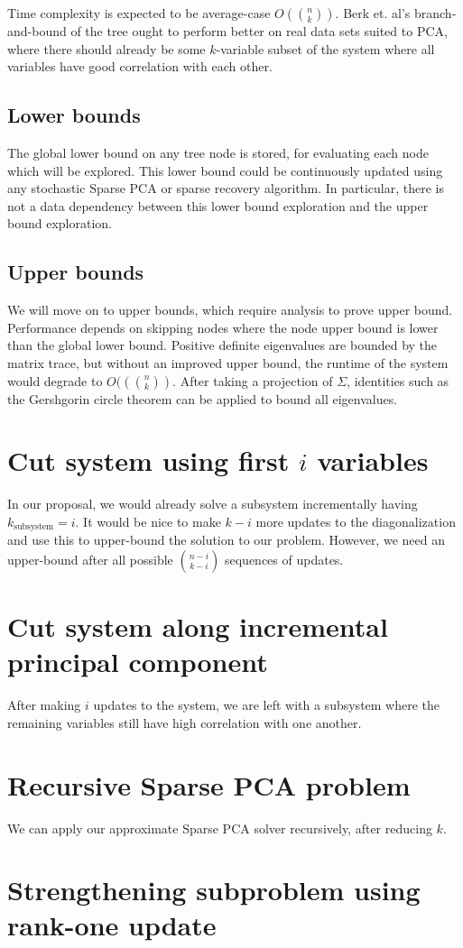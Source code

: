 \documentclass{article}
\begin{document}
Time complexity is expected to be average-case $O\left(\binom{n}{k}\right)$. Berk et. al's branch-and-bound of the tree ought to perform better on real data sets suited to PCA, where there should already be some $k$-variable subset of the system where all variables have good correlation with each other.

\subsection{Lower bounds}

The global lower bound on any tree node is stored, for evaluating each node which will be explored. This lower bound could be continuously updated using any stochastic Sparse PCA or sparse recovery algorithm. In particular, there is not a data dependency between this lower bound exploration and the upper bound exploration.

\subsection{Upper bounds}

We will move on to upper bounds, which require analysis to prove upper bound. Performance depends on skipping nodes where the node upper bound is lower than the global lower bound. Positive definite eigenvalues are bounded by the matrix trace, but without an improved upper bound, the runtime of the system would degrade to $O(\left(\binom{n}{k}\right)$. After taking a projection of $\Sigma$, identities such as the Gershgorin circle theorem can be applied to bound all eigenvalues.

\section{Cut system using first $i$ variables}

In our proposal, we would already solve a subsystem incrementally having $k_\text{subsystem}=i$. It would be nice to make $k-i$ more updates to the diagonalization and use this to upper-bound the solution to our problem. However, we need an upper-bound after all possible $\binom{n-i}{k-i}$ sequences of updates.

\section{Cut system along incremental principal component}

After making $i$ updates to the system, we are left with a subsystem where the remaining variables still have high correlation with one another.

\section{Recursive Sparse PCA problem}

We can apply our approximate Sparse PCA solver recursively, after reducing $k$.

\section{Strengthening subproblem using rank-one update}
\end{document}

